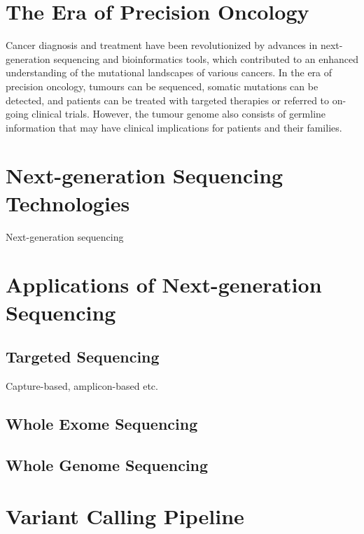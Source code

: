 \section{The Era of Precision Oncology}
\label{sec:TheEraofPrecisionOncology}

Cancer diagnosis and treatment have been revolutionized by advances in next-generation sequencing and bioinformatics tools, which contributed to an enhanced understanding of the mutational landscapes of various cancers. In the era of precision oncology, tumours can be sequenced, somatic mutations can be detected, and patients can be treated with targeted therapies or referred to on-going clinical trials. However, the tumour genome also consists of germline information that may have clinical implications for patients and their families.


\section{Next-generation Sequencing Technologies}
\label{sec:Next-generationSequencingTechnologies}

Next-generation sequencing


\section{Applications of Next-generation Sequencing}
\label{sec:ApplicationsofNext-generationSequencing}

\subsection{Targeted Sequencing}
Capture-based, amplicon-based etc.

\subsection{Whole Exome Sequencing}

\subsection{Whole Genome Sequencing}

\section{Variant Calling Pipeline}
\label{sec:VariantCallingPipeline}


